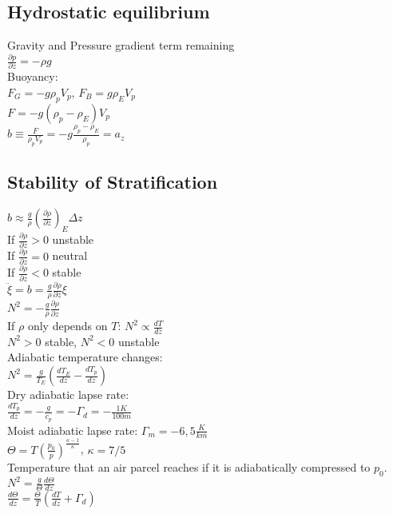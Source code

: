 \subsection*{Hydrostatic equilibrium}
Gravity and Pressure gradient term remaining\\
$\frac{\partial p}{\partial z}=-\rho g$\\
Buoyancy:\\
$F_G=-g\rho_pV_p$, $F_B=g\rho_EV_p$\\
$F=-g(\rho_p-\rho_E)V_p$\\
$b\equiv \frac{F}{\rho_p V_p}=-g\frac{\rho_p-\rho_E}{\rho_p}=a_z$
\subsection*{Stability of Stratification}
$b\approx\frac{g}{\rho}\left(\frac{\partial\rho}{\partial z}\right)_E \Delta z$\\
If $\frac{\partial\rho}{\partial z}>0$ unstable\\
If $\frac{\partial\rho}{\partial z}=0$ neutral\\
If $\frac{\partial\rho}{\partial z}<0$ stable\\
$\ddot{\xi}=b=\frac{g}{\rho}\frac{\partial\rho}{\partial z} \xi$\\
$N^2=-\frac{g}{\rho}\frac{\partial\rho}{\partial z}$\\
If $\rho$ only depends on $T$: $N^2\propto \frac{dT}{dz}$\\
$N^2>0$ stable, $N^2<0$ unstable\\
Adiabatic temperature changes:\\
$N^2=\frac{g}{T_E}\left(\frac{dT_E}{dz}-\frac{dT_p}{dz}\right)$\\
Dry adiabatic lapse rate:\\ $\frac{dT_p}{dz}=-\frac{g}{c_p}=-\Gamma_d=-\frac{1K}{100m}$\\
Moist adiabatic lapse rate: $\Gamma_m=-6,5\frac{K}{km}$\\
$\Theta=T\left(\frac{p_0}{p}\right)^{\frac{\kappa-1}{\kappa}}$, $\kappa = 7/5$\\
Temperature that an air parcel reaches if it is adiabatically compressed to $p_0$.\\
$N^2 = \frac{g}{\Theta}\frac{d\Theta}{dz}$\\
$\frac{d\Theta}{dz}=\frac{\Theta}{T}\left(\frac{dT}{dz}+\Gamma_d\right)$
